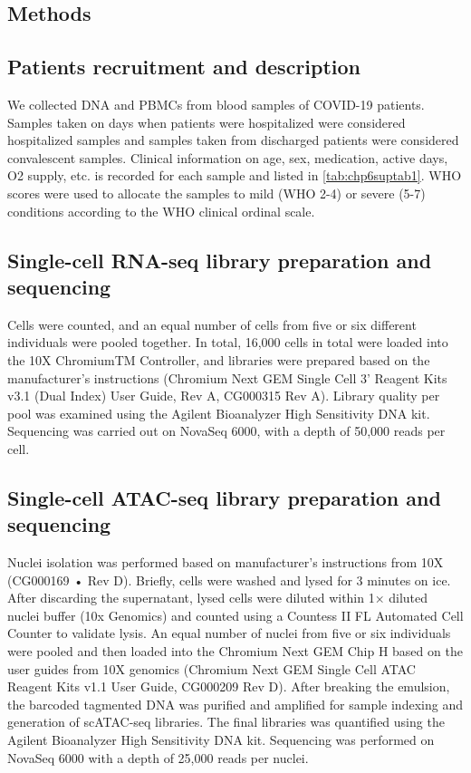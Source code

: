 \documentclass{book}
\begin{document}
\begin{refsection}
\section*{Methods}
\subsection*{Patients recruitment and description}
We collected DNA and PBMCs from blood samples of COVID-19 patients.
Samples taken on days when patients were hospitalized were considered hospitalized samples and samples taken from discharged patients were considered convalescent samples.
Clinical information on age, sex, medication, active days, O2 supply, etc. is recorded for each sample and listed in \ref{tab:chp6suptab1}.
WHO scores were used to allocate the samples to mild (WHO 2-4) or severe (5-7) conditions according to the WHO clinical ordinal scale.

\subsection*{Single-cell RNA-seq library preparation and sequencing}
Cells were counted, and an equal number of cells from five or six different individuals were pooled together.
In total, 16,000 cells in total were loaded into the 10X ChromiumTM Controller, and libraries were prepared based on the manufacturer's instructions (Chromium Next GEM Single Cell 3’ Reagent Kits v3.1 (Dual Index) User Guide, Rev A, CG000315 Rev A).
Library quality per pool was examined using the Agilent Bioanalyzer High Sensitivity DNA kit.
Sequencing was carried out on NovaSeq 6000, with a depth of 50,000 reads per cell.

\subsection*{Single-cell ATAC-seq library preparation and sequencing}
Nuclei isolation was performed based on manufacturer's instructions from 10X (CG000169 • Rev D).
Briefly, cells were washed and lysed for 3 minutes on ice.
After discarding the supernatant, lysed cells were diluted within 1× diluted nuclei buffer (10x Genomics) and counted using a Countess II FL Automated Cell Counter to validate lysis.
An equal number of nuclei from five or six individuals were pooled and then loaded into the Chromium Next GEM Chip H based on the user guides from 10X genomics (Chromium Next GEM Single Cell ATAC Reagent Kits v1.1 User Guide, CG000209 Rev D).
After breaking the emulsion, the barcoded tagmented DNA was purified and amplified for sample indexing and generation of scATAC-seq libraries.
The final libraries was quantified using the Agilent Bioanalyzer High Sensitivity DNA kit.
Sequencing was performed on NovaSeq 6000 with a depth of 25,000 reads per nuclei.


\end{refsection}
\end{document}
